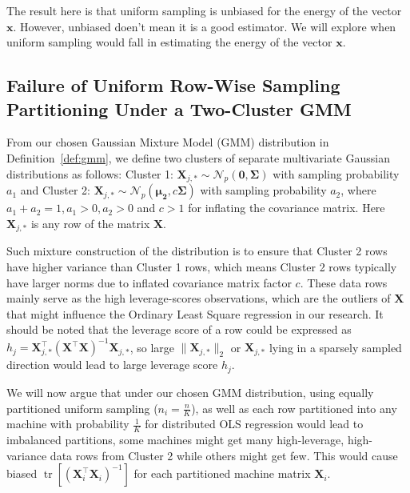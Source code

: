 \documentclass[11pt]{article}
\numberwithin{equation}{section}
\theoremstyle{plain}
\theoremstyle{definition}
\theoremstyle{remark}
\begin{document}
The result here is that uniform sampling is unbiased for the energy of the vector $\mathbf{x}$. However, unbiased doen't mean it is a good estimator.
We will explore when uniform sampling would fall in estimating the energy of the vector $\mathbf{x}$.

\subsection{Failure of Uniform Row-Wise Sampling Partitioning Under a Two-Cluster GMM}
From our chosen Gaussian Mixture Model (GMM) distribution in Definition~\ref{def:gmm}, we define two clusters of separate multivariate Gaussian distributions as follows:
Cluster 1: \( \mathbf{X}_{j,\ast} \sim \mathcal{N}_p(\boldsymbol{0}, \mathbf{\Sigma}) \) with sampling probability $a_1$ and Cluster 2: \( \mathbf{X}_{j,\ast} \sim \mathcal{N}_p(\boldsymbol{\mu_2}, c\mathbf{\Sigma}) \) with sampling probability $a_2$, where $a_1 + a_2 = 1, a_1 > 0, a_2 > 0$ and $c > 1$ for inflating the covariance matrix.
Here \( \mathbf{X}_{j,\ast}\) is any row of the matrix \(\mathbf{X}\).

Such mixture construction of the distribution is to ensure that Cluster 2 rows have higher variance than Cluster 1 rows, which means Cluster 2 rows typically have larger norms due to inflated covariance matrix factor \(c\).
These data rows mainly serve as the high leverage-scores observations, which are the outliers of $\mathbf{X}$ that might influence the Ordinary Least Square regression in our research.
It should be noted that the leverage score of a row could be expressed as $h_j = \mathbf{X}_{j,\ast}^{\top}(\mathbf{X}^{\top}\mathbf{X})^{-1}\mathbf{X}_{j,\ast}$, so large $\|\mathbf{X}_{j,\ast}\|_2$ or $\mathbf{X}_{j,\ast}$ lying in a sparsely sampled direction \cite{Singh2023active} would lead to large leverage score $h_j$.

We will now argue that under our chosen GMM distribution, using equally partitioned uniform sampling ($n_{i} = \frac{n}{K}$), as well as each row partitioned into any machine with probability $\frac{1}{K}$ for distributed OLS regression would lead to imbalanced partitions, some machines might get many high-leverage, high-variance data rows from Cluster 2 while others might get few. This would cause biased $\operatorname{tr}[(\mathbf{X}_i^{\top}\mathbf{X}_i)^{-1}]$ for each partitioned machine matrix $\mathbf{X}_i$.
\end{document}
